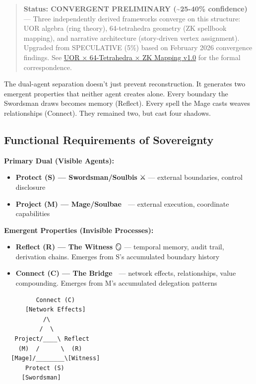 \documentclass[
]{article}
\begin{document}
\begin{quote}
\textbf{Status: CONVERGENT PRELIMINARY (\textasciitilde25-40\%
confidence)} --- Three independently derived frameworks converge on this
structure: UOR algebra (ring theory), 64-tetrahedra geometry (ZK
spellbook mapping), and narrative architecture (story-driven vertex
assignment). Upgraded from SPECULATIVE (5\%) based on February 2026
convergence findings. See \href{uor_tetrahedra_zk_mapping_v1_0.md}{UOR ×
64-Tetrahedra × ZK Mapping v1.0} for the formal correspondence.
\end{quote}

The dual-agent separation doesn't just prevent reconstruction. It
generates two emergent properties that neither agent creates alone.
Every boundary the Swordsman draws becomes memory (Reflect). Every spell
the Mage casts weaves relationships (Connect). They remained two, but
cast four shadows.

\subsection{Functional Requirements of
Sovereignty}\label{functional-requirements-of-sovereignty}

\textbf{Primary Dual (Visible Agents):}

\begin{itemize}
\item
  \textbf{Protect (S) --- Swordsman/Soulbis} ⚔️ --- external boundaries,
  control disclosure
\item
  \textbf{Project (M) --- Mage/Soulbae} 🧙 --- external execution,
  coordinate capabilities
\end{itemize}

\textbf{Emergent Properties (Invisible Processes):}

\begin{itemize}
\item
  \textbf{Reflect (R) --- The Witness} 🪞 --- temporal memory, audit
  trail, derivation chains. Emerges from S's accumulated boundary
  history
\item
  \textbf{Connect (C) --- The Bridge} 🤝 --- network effects,
  relationships, value compounding. Emerges from M's accumulated
  delegation patterns
\end{itemize}

\begin{verbatim}
         Connect (C)
      [Network Effects]
           /\
          /  \
   Project/____\ Reflect
    (M)  /      \  (R)
  [Mage]/________\[Witness]
      Protect (S)
     [Swordsman]
\end{verbatim}
\end{document}

